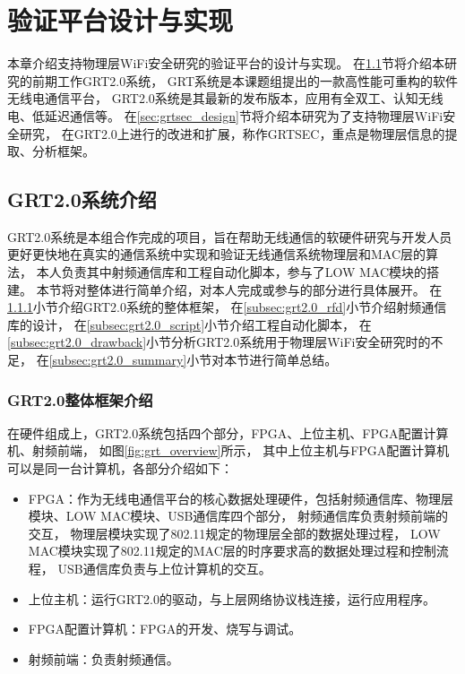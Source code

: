 
\chapter{验证平台设计与实现}\label{chap:implementation}
	本章介绍支持物理层WiFi安全研究的验证平台的设计与实现。
	在\ref{sec:grt2.0_design}节将介绍本研究的前期工作GRT2.0系统，
	GRT系统是本课题组提出的一款高性能可重构的软件无线电通信平台\cite{pkuraw}，
	GRT2.0系统是其最新的发布版本，应用有全双工\cite{mna16grt}、认知无线电\cite{fpga17grt}、低延迟通信等。
	在\ref{sec:grtsec_design}节将介绍本研究为了支持物理层WiFi安全研究，
	在GRT2.0上进行的改进和扩展，称作GRTSEC，重点是物理层信息的提取、分析框架。

	\section{GRT2.0系统介绍}\label{sec:grt2.0_design}
		GRT2.0系统是本组合作完成的项目，旨在帮助无线通信的软硬件研究与开发人员
		更好更快地在真实的通信系统中实现和验证无线通信系统物理层和MAC层的算法，
		本人负责其中射频通信库和工程自动化脚本，参与了LOW MAC模块的搭建。
		本节将对整体进行简单介绍，对本人完成或参与的部分进行具体展开。
		在\ref{subsec:grt2.0_overview}小节介绍GRT2.0系统的整体框架，
		在\ref{subsec:grt2.0_rfd}小节介绍射频通信库的设计，
		在\ref{subsec:grt2.0_script}小节介绍工程自动化脚本，
		在\ref{subsec:grt2.0_drawback}小节分析GRT2.0系统用于物理层WiFi安全研究时的不足，
		在\ref{subsec:grt2.0_summary}小节对本节进行简单总结。

		\subsection{GRT2.0整体框架介绍}\label{subsec:grt2.0_overview}
		在硬件组成上，GRT2.0系统包括四个部分，FPGA、上位主机、FPGA配置计算机、射频前端，
		如图\ref{fig:grt_overview}所示，
		其中上位主机与FPGA配置计算机可以是同一台计算机，各部分介绍如下：
			\begin{itemize}
				\item FPGA：作为无线电通信平台的核心数据处理硬件，包括射频通信库、物理层模块、LOW MAC模块、USB通信库四个部分，
				射频通信库负责射频前端的交互，
				物理层模块实现了802.11规定的物理层全部的数据处理过程，
				LOW MAC模块实现了802.11规定的MAC层的时序要求高的数据处理过程和控制流程，
				USB通信库负责与上位计算机的交互。
				\item 上位主机：运行GRT2.0的驱动，与上层网络协议栈连接，运行应用程序。
				\item FPGA配置计算机：FPGA的开发、烧写与调试。
				\item 射频前端：负责射频通信。
			\end{itemize}

